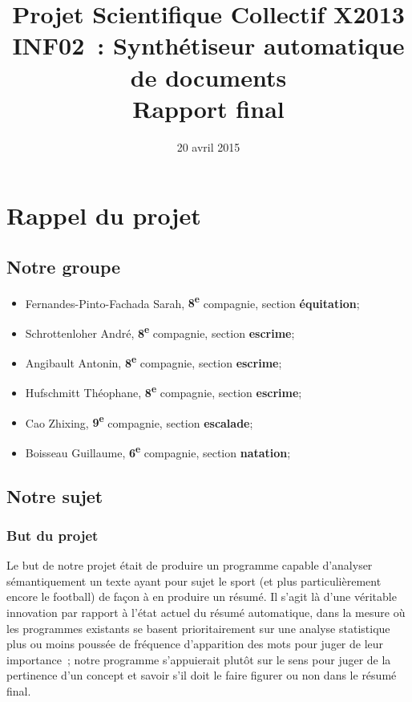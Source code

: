 \documentclass[a4paper, 12pt]{article}
\title{Projet Scientifique Collectif X2013 \\INF02~: Synthétiseur automatique de documents \\Rapport final}
\author{\membres} %
\date{20 avril 2015}
\begin{document}
\titrelong{}


\tableofcontents
\newpage

\section{Rappel du projet}

\subsection{Notre groupe}
\begin{itemize}
 \item Fernandes-Pinto-Fachada Sarah, \textbf{8\textsuperscript{e}} compagnie, section \textbf{équitation};
 \item Schrottenloher André, \textbf{8\textsuperscript{e}} compagnie, section \textbf{escrime};
 \item Angibault Antonin, \textbf{8\textsuperscript{e}} compagnie, section \textbf{escrime};
 \item Hufschmitt Théophane, \textbf{8\textsuperscript{e}} compagnie, section \textbf{escrime};
 \item Cao Zhixing, \textbf{9\textsuperscript{e}} compagnie, section \textbf{escalade};
 \item Boisseau Guillaume, \textbf{6\textsuperscript{e}} compagnie, section \textbf{natation};
\end{itemize}

\subsection{Notre sujet}

\subsubsection{But du projet}

Le but de notre projet était de produire un programme capable d'analyser sémantiquement un texte ayant pour sujet le sport (et plus particulièrement encore le football) de façon à en produire un résumé. Il s'agit là d'une véritable innovation par rapport à l'état actuel du résumé automatique, dans la mesure où les programmes existants se basent prioritairement sur une analyse statistique plus ou moins poussée de fréquence d'apparition des mots pour juger de leur importance~; notre programme s'appuierait plutôt sur le sens pour juger de la pertinence d'un concept et savoir s'il doit le faire figurer ou non dans le résumé final.
\end{document}
